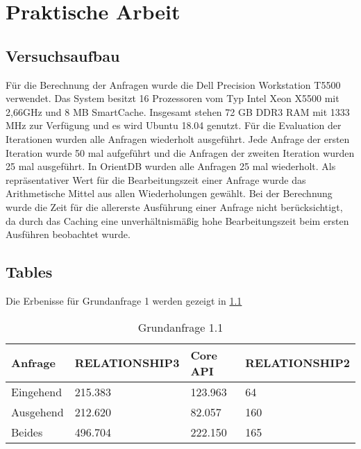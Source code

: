 
\chapter{Praktische Arbeit} %

\label{Kaptiel4} %

\section{Versuchsaufbau}
Für die Berechnung der Anfragen wurde die Dell Precision Workstation T5500 verwendet. Das System besitzt 16 Prozessoren vom Typ Intel Xeon  X5500 mit 2,66GHz und  8 MB SmartCache. Insgesamt stehen 72 GB DDR3 RAM mit 1333 MHz zur Verfügung und es wird Ubuntu 18.04 genutzt. Für die Evaluation der Iterationen wurden alle Anfragen wiederholt ausgeführt. \newline
 Jede Anfrage der ersten Iteration wurde 50 mal aufgeführt und die Anfragen der zweiten Iteration wurden 25 mal ausgeführt. In OrientDB wurden alle Anfragen 25 mal wiederholt. Als repräsentativer Wert für die Bearbeitungszeit einer Anfrage  wurde das Arithmetische Mittel aus allen Wiederholungen gewählt. Bei der Berechnung wurde die Zeit für die allererste Ausführung einer Anfrage nicht berücksichtigt, da durch das Caching eine unverhältnismäßig hohe Bearbeitungszeit beim ersten Ausführen beobachtet wurde. 
\section{Tables}
Die Erbenisse für Grundanfrage 1 werden gezeigt in \ref{tab:Query1_1}
\begin{table}[!htb]
\centering
\begin{tabular}{ |p{3cm}||p{3cm}|p{3cm}|p{3cm}|  }
	\hline
	Anfrage& RELATIONSHIP3 &Core API&RELATIONSHIP2\\
	\hline
	Eingehend   & 215.383    &123.963&  64\\
	Ausgehend&    212.620  & 82.057   & 160\\
	Beides&496.704 & 222.150&  165\\
	\hline
\end{tabular}
\caption{Grundanfrage 1.1}
\label{tab:Query1_1}
\end{table}

